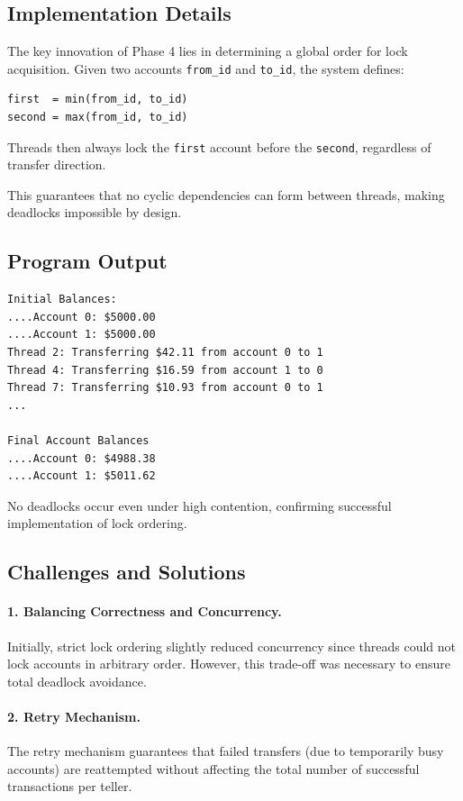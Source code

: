 \documentclass[12pt]{article}
\begin{document}
\subsection{Implementation Details}
The key innovation of Phase 4 lies in determining a global order for lock acquisition.
Given two accounts \texttt{from\_id} and \texttt{to\_id}, the system defines:
\begin{verbatim}
first  = min(from_id, to_id)
second = max(from_id, to_id)
\end{verbatim}
Threads then always lock the \texttt{first} account before the \texttt{second}, regardless of transfer direction.

This guarantees that no cyclic dependencies can form between threads, making deadlocks impossible by design.

\subsection{Program Output}
\begin{lstlisting}[caption={Phase 4 Output}]
Initial Balances:
....Account 0: $5000.00
....Account 1: $5000.00
Thread 2: Transferring $42.11 from account 0 to 1
Thread 4: Transferring $16.59 from account 1 to 0
Thread 7: Transferring $10.93 from account 0 to 1
...

Final Account Balances
....Account 0: $4988.38
....Account 1: $5011.62
\end{lstlisting}

No deadlocks occur even under high contention, confirming successful implementation of lock ordering.

\subsection{Challenges and Solutions}
\paragraph{1. Balancing Correctness and Concurrency.}
Initially, strict lock ordering slightly reduced concurrency since threads could not lock accounts in arbitrary order.
However, this trade-off was necessary to ensure total deadlock avoidance.

\paragraph{2. Retry Mechanism.}
The retry mechanism guarantees that failed transfers (due to temporarily busy accounts) are reattempted without affecting the total number of successful transactions per teller.
\end{document}

